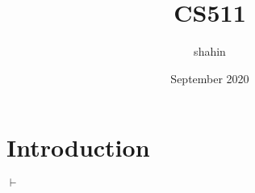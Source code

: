 \documentclass{article}
\title{CS511}
\author{shahin }
\date{September 2020}
\begin{document}
\maketitle

\section{Introduction}
$\vdash$ 
\end{document}
